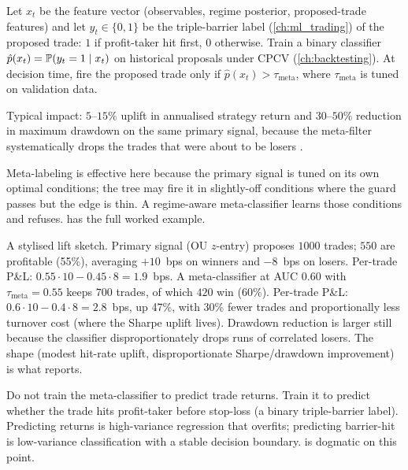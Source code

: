 \begin{keyfactbox}
Let $x_t$ be the feature vector (observables, regime posterior,
proposed-trade features) and let $y_t \in \{0, 1\}$ be the triple-barrier
label (\cref{ch:ml_trading}) of the proposed trade: $1$ if
profit-taker hit first, $0$ otherwise. Train a binary classifier
$\hat{p}(x_t) = \mathbb{P}(y_t = 1 \mid x_t)$ on historical proposals
under CPCV (\cref{ch:backtesting}). At decision time, fire the
proposed trade only if $\hat{p}(x_t) > \tau_{\text{meta}}$, where
$\tau_{\text{meta}}$ is tuned on validation data.

Typical impact: $5$--$15\%$ uplift in annualised strategy return
and $30$--$50\%$ reduction in maximum drawdown on the same
primary signal, because the meta-filter systematically drops the
trades that were about to be losers
\citeAFML{}.
\end{keyfactbox}

Meta-labeling is effective here because the primary signal is
tuned on its own optimal conditions; the tree may fire it in
slightly-off conditions where the guard passes but the edge is
thin. A regime-aware meta-classifier learns those conditions and
refuses.  has the full worked example.

A stylised lift sketch. Primary signal (OU $z$-entry) proposes
$1000$ trades; $550$ are profitable (55\%), averaging $+10$~bps on
winners and $-8$~bps on losers. Per-trade P\&L: $0.55 \cdot 10 -
0.45 \cdot 8 = 1.9$~bps. A meta-classifier at AUC $0.60$ with
$\tau_{\text{meta}} = 0.55$ keeps $700$ trades, of which $420$ win
(60\%). Per-trade P\&L: $0.6 \cdot 10 - 0.4 \cdot 8 = 2.8$~bps,
up 47\%, with 30\% fewer trades and proportionally less turnover
cost (where the Sharpe uplift lives). Drawdown reduction is larger
still because the classifier disproportionately drops runs of
correlated losers. The shape (modest hit-rate uplift,
disproportionate Sharpe/drawdown improvement) is what \citeAFML{}
reports.

\begin{pitfallbox}
Do not train the meta-classifier to predict trade returns. Train it
to predict whether the trade hits profit-taker before stop-loss (a
binary triple-barrier label). Predicting returns is high-variance
regression that overfits; predicting barrier-hit is low-variance
classification with a stable decision boundary. \citeAFML{} is
dogmatic on this point.
\end{pitfallbox}


